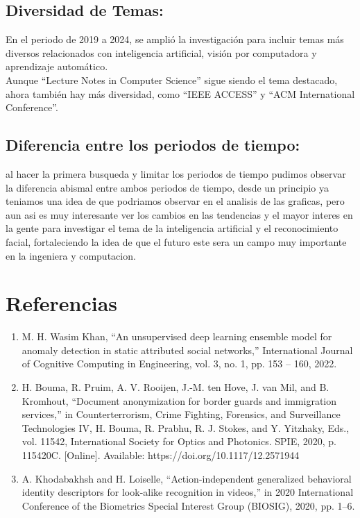 \documentclass[conference]{IEEEtran}
\begin{document}
\subsection{Diversidad de Temas:}
En el periodo de 2019 a 2024, se amplió la investigación para incluir temas más diversos relacionados con inteligencia artificial, visión por computadora y aprendizaje automático.\\
Aunque “Lecture Notes in Computer Science” sigue siendo el tema destacado, ahora también hay más diversidad, como “IEEE ACCESS” y “ACM International Conference”.

\subsection{Diferencia entre los periodos de tiempo:}
al hacer la primera busqueda y limitar los periodos de tiempo pudimos observar la diferencia abismal entre ambos periodos de tiempo, desde un principio ya teniamos una idea de que podriamos observar en el analisis de las graficas, pero aun asi es muy interesante ver los cambios en las tendencias y el mayor interes en la gente para investigar el tema de la inteligencia artificial y el reconocimiento facial, fortaleciendo la idea de que el futuro este sera un campo muy importante en la ingeniera y computacion.
\section{Referencias}

\begin{enumerate}
    \item M. H. Wasim Khan, “An unsupervised deep learning ensemble model for anomaly detection in static attributed social networks,” International Journal of Cognitive Computing in Engineering, vol. 3, no. 1, pp. 153 – 160, 2022.

    \item H. Bouma, R. Pruim, A. V. Rooijen, J.-M. ten Hove, J. van Mil, and B. Kromhout, “Document anonymization for border guards and immigration services,” in Counterterrorism, Crime Fighting, Forensics, and Surveillance Technologies IV, H. Bouma, R. Prabhu, R. J. Stokes, and Y. Yitzhaky, Eds., vol. 11542, International Society for Optics and Photonics. SPIE, 2020, p. 115420C. [Online]. Available: https://doi.org/10.1117/12.2571944

    \item A. Khodabakhsh and H. Loiselle, “Action-independent generalized behavioral identity descriptors for look-alike recognition in videos,” in 2020 International Conference of the Biometrics Special Interest Group (BIOSIG), 2020, pp. 1–6.
\end{enumerate}


\end{document}
